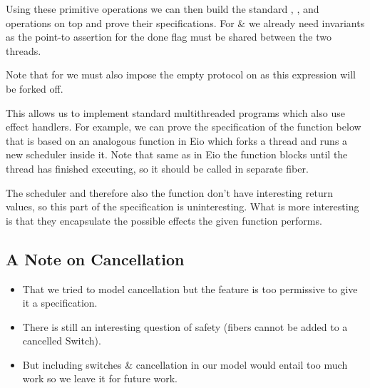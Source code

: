 
Using these primitive operations we can then build the standard , , and  operations on top and prove their specifications.
For  \&  we already need invariants as the point-to assertion for the done flag must be shared between the two threads.





Note that for  we must also impose the empty protocol on  as this expression will be forked off.

This allows us to implement standard multithreaded programs which also use effect handlers.
For example, we can prove the specification of the function below that is based on an analogous function in Eio which forks a thread and runs a new scheduler inside it.
Note that same as in Eio the function blocks until the thread has finished executing, so it should be called in separate fiber.



The scheduler  and therefore also the  function don't have interesting return values, so this part of the specification is uninteresting.
What is more interesting is that they encapsulate the possible effects the given function  performs.

\subsection{A Note on Cancellation}
\label{sec:apdx-cancellation}

\begin{itemize}
    \item That we tried to model cancellation but the feature is too permissive to give it a specification.
    \item There is still an interesting question of safety (fibers cannot be added to a cancelled Switch).
    \item But including switches \& cancellation in our model would entail too much work so we leave it for future work.
\end{itemize}
